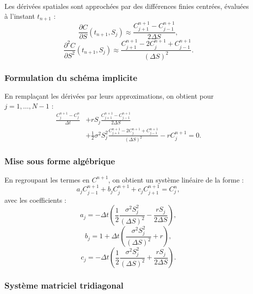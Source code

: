 \documentclass[12pt,a4paper]{article}
\begin{document}
Les dérivées spatiales sont approchées par des différences finies centrées,
évaluées à l’instant $t_{n+1}$ :
\[
\frac{\partial C}{\partial S}(t_{n+1},S_j)
\approx
\frac{C_{j+1}^{n+1} - C_{j-1}^{n+1}}{2\Delta S},
\]
\[
\frac{\partial^2 C}{\partial S^2}(t_{n+1},S_j)
\approx
\frac{C_{j+1}^{n+1} - 2C_j^{n+1} + C_{j-1}^{n+1}}{(\Delta S)^2}.
\]

\subsubsection*{Formulation du schéma implicite}

En remplaçant les dérivées par leurs approximations, on obtient pour
$j = 1,\dots,N-1$ :
\begin{align}
\frac{C_j^{n+1} - C_j^n}{\Delta t}
&+
rS_j \frac{C_{j+1}^{n+1} - C_{j-1}^{n+1}}{2\Delta S}
\\
&+
\frac{1}{2}\sigma^2 S_j^2
\frac{C_{j+1}^{n+1} - 2C_j^{n+1} + C_{j-1}^{n+1}}{(\Delta S)^2}
-
r C_j^{n+1}
= 0.
\end{align}

\subsubsection*{Mise sous forme algébrique}

En regroupant les termes en $C^{n+1}$, on obtient un système linéaire de la forme :
\[
a_j C_{j-1}^{n+1}
+ b_j C_j^{n+1}
+ c_j C_{j+1}^{n+1}
=
C_j^n,
\]
avec les coefficients :
\[
a_j =
-\Delta t
\left(
\frac{1}{2}\frac{\sigma^2 S_j^2}{(\Delta S)^2}
-
\frac{rS_j}{2\Delta S}
\right),
\]
\[
b_j =
1
+
\Delta t
\left(
\frac{\sigma^2 S_j^2}{(\Delta S)^2}
+
r
\right),
\]
\[
c_j =
-\Delta t
\left(
\frac{1}{2}\frac{\sigma^2 S_j^2}{(\Delta S)^2}
+
\frac{rS_j}{2\Delta S}
\right).
\]

\subsubsection*{Système matriciel tridiagonal}
\end{document}
